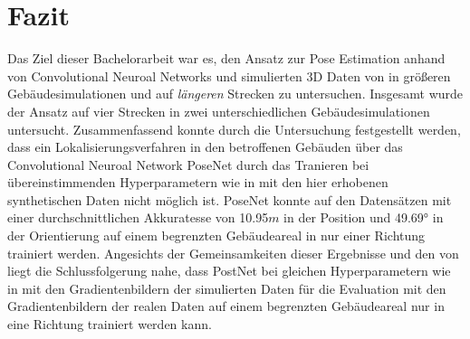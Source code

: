 
\section{Fazit}
\label{sec:kapitel_6}
Das Ziel dieser Bachelorarbeit war es, den Ansatz zur Pose Estimation anhand von Convolutional Neuroal Networks und simulierten 3D Daten von \citet{acharyaBIMPoseNetIndoorCamera2019} in größeren Gebäudesimulationen und auf \textit{längeren} Strecken zu untersuchen.
Insgesamt wurde der Ansatz auf vier Strecken in zwei unterschiedlichen Gebäudesimulationen untersucht. Zusammenfassend konnte durch die Untersuchung festgestellt werden, dass ein Lokalisierungsverfahren in den betroffenen Gebäuden über das Convolutional Neuroal Network PoseNet durch das Tranieren bei übereinstimmenden Hyperparametern wie in \cite{acharyaBIMPoseNetIndoorCamera2019} mit den hier erhobenen synthetischen Daten nicht möglich ist. PoseNet konnte auf den Datensätzen mit einer durchschnittlichen Akkuratesse von 10.95$m$ in der Position und 49.69° in der Orientierung auf einem begrenzten Gebäudeareal in nur einer Richtung trainiert werden. Angesichts der Gemeinsamkeiten dieser Ergebnisse und den von \citet{acharyaBIMPoseNetIndoorCamera2019} liegt die Schlussfolgerung nahe, dass PostNet bei gleichen Hyperparametern wie in \cite{acharyaBIMPoseNetIndoorCamera2019} mit den Gradientenbildern der simulierten Daten für die Evaluation mit den Gradientenbildern der realen Daten auf einem begrenzten Gebäudeareal nur in eine Richtung trainiert werden kann.